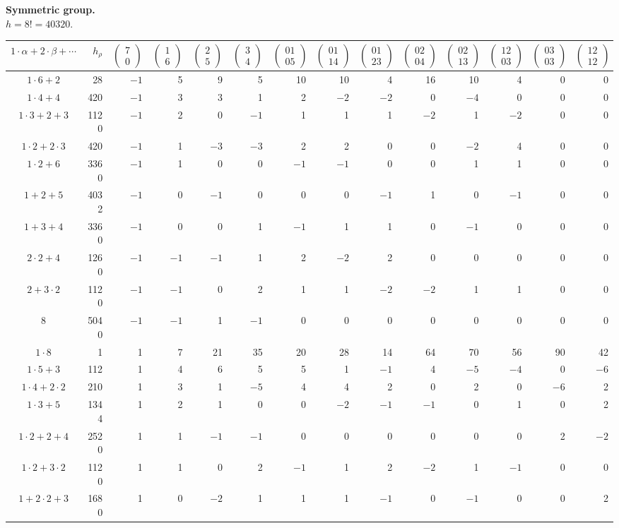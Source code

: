 \documentclass[11pt]{article}
\newcommand{\ch}[2]{\left(\begin{smallmatrix}#1\\#2\end{smallmatrix}\right)}
\begin{document}
\begin{landscape}
\begin{center}
\small
\textbf{Symmetric group.}\\
$h=8!=40320.$\\[0.5em]
\setlength{\tabcolsep}{3.5pt}
\renewcommand{\arraystretch}{1.15}
\begin{tabular}{c r|rrrrrrrrrrrr}
\toprule
$1\cdot\alpha+2\cdot\beta+\cdots$ & $h_\rho$ & $\ch{7}{0}$ & $\ch{1}{6}$ & $\ch{2}{5}$ & $\ch{3}{4}$ & $\ch{01}{05}$ & $\ch{01}{14}$ & $\ch{01}{23}$ & $\ch{02}{04}$ & $\ch{02}{13}$ & $\ch{12}{03}$ & $\ch{03}{03}$ & $\ch{12}{12}$\\
\midrule
$1\cdot6+2$ & 28 & $-1$ & 5 & 9 & 5 & 10 & 10 & 4 & 16 & 10 & 4 & 0 & 0\\
$1\cdot4+4$ & 420 & $-1$ & 3 & 3 & 1 & 2 & $-2$ & $-2$ & 0 & $-4$ & 0 & 0 & 0\\
$1\cdot3+2+3$ & 1120 & $-1$ & 2 & 0 & $-1$ & 1 & 1 & 1 & $-2$ & 1 & $-2$ & 0 & 0\\
$1\cdot2+2\cdot3$ & 420 & $-1$ & 1 & $-3$ & $-3$ & 2 & 2 & 0 & 0 & $-2$ & 4 & 0 & 0\\
$1\cdot2+6$ & 3360 & $-1$ & 1 & 0 & 0 & $-1$ & $-1$ & 0 & 0 & 1 & 1 & 0 & 0\\
$1+2+5$ & 4032 & $-1$ & 0 & $-1$ & 0 & 0 & 0 & $-1$ & 1 & 0 & $-1$ & 0 & 0\\
$1+3+4$ & 3360 & $-1$ & 0 & 0 & 1 & $-1$ & 1 & 1 & 0 & $-1$ & 0 & 0 & 0\\
$2\cdot2+4$ & 1260 & $-1$ & $-1$ & $-1$ & 1 & 2 & $-2$ & 2 & 0 & 0 & 0 & 0 & 0\\
$2+3\cdot2$ & 1120 & $-1$ & $-1$ & 0 & 2 & 1 & 1 & $-2$ & $-2$ & 1 & 1 & 0 & 0\\
$8$ & 5040 & $-1$ & $-1$ & 1 & $-1$ & 0 & 0 & 0 & 0 & 0 & 0 & 0 & 0\\
\midrule
$1\cdot8$ & 1 & 1 & 7 & 21 & 35 & 20 & 28 & 14 & 64 & 70 & 56 & 90 & 42\\
$1\cdot5+3$ & 112 & 1 & 4 & 6 & 5 & 5 & 1 & $-1$ & 4 & $-5$ & $-4$ & 0 & $-6$\\
$1\cdot4+2\cdot2$ & 210 & 1 & 3 & 1 & $-5$ & 4 & 4 & 2 & 0 & 2 & 0 & $-6$ & 2\\
$1\cdot3+5$ & 1344 & 1 & 2 & 1 & 0 & 0 & $-2$ & $-1$ & $-1$ & 0 & 1 & 0 & 2\\
$1\cdot2+2+4$ & 2520 & 1 & 1 & $-1$ & $-1$ & 0 & 0 & 0 & 0 & 0 & 0 & 2 & $-2$\\
$1\cdot2+3\cdot2$ & 1120 & 1 & 1 & 0 & 2 & $-1$ & 1 & 2 & $-2$ & 1 & $-1$ & 0 & 0\\
$1+2\cdot2+3$ & 1680 & 1 & 0 & $-2$ & 1 & 1 & 1 & $-1$ & 0 & $-1$ & 0 & 0 & 2\\

\end{tabular}
\end{center}
\end{landscape}
\end{document}
